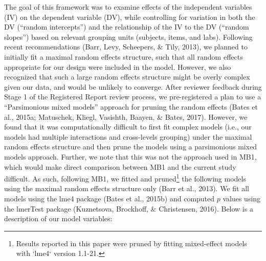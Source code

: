 \documentclass[english,,man,floatsintext]{apa6}
\begin{document}
The goal of this framework was to examine effects of the independent variables (IV) on the dependent variable (DV), while controlling for variation in both the DV (\enquote{random intercepts}) and the relationship of the IV to the DV (\enquote{random slopes}) based on relevant grouping units (subjects, items, and labs). Following recent recommendations (Barr, Levy, Scheepers, \& Tily, 2013), we planned to initially fit a maximal random effects structure, such that all random effects appropriate for our design were included in the model. However, we also recognized that such a large random effects structure might be overly complex given our data, and would be unlikely to converge. After reviewer feedback during Stage 1 of the Registered Report review process, we pre-registered a plan to use a \enquote{Parsimonious mixed models} approach for pruning the random effects (Bates et al., 2015a; Matuschek, Kliegl, Vasishth, Baayen, \& Bates, 2017). However, we found that it was computationally difficult to first fit complex models (i.e., our models had multiple interactions and cross-levels grouping) under the maximal random effects structure and then prune the models using a parsimonious mixed models approach. Further, we note that this was not the approach used in MB1, which would make direct comparison between MB1 and the current study difficult. As such, following MB1, we fitted and pruned\footnote{Results reported in this paper were pruned by fitting mixed-effect models with `lme4` version 1.1-21.} the following models using the maximal random effects structure only (Barr et al., 2013). We fit all models using the lme4 package (Bates et al., 2015b) and computed \(p\) values using the lmerTest package (Kuznetsova, Brockhoff, \& Christensen, 2016). Below is a description of our model variables:
\end{document}
